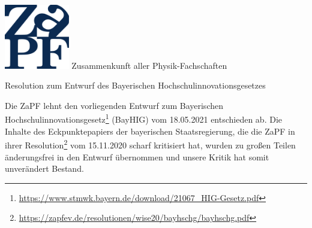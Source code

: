 \documentclass[DIV=calc]{scrartcl}
\begin{document}
\hspace{0.87\textwidth}
\begin{minipage}{120pt}
	\vspace{-1.8cm}
	\includegraphics[width=80pt]{../logo.pdf}
	\centering
	\small Zusammenkunft aller Physik-Fachschaften
\end{minipage}

\begin{center}
  \huge{Resolution zum Entwurf des Bayerischen Hochschulinnovationsgesetzes}\vspace{.25\baselineskip}\\
  \normalsize
\end{center}
\vspace{1cm}





Die ZaPF lehnt den vorliegenden Entwurf zum Bayerischen Hochschulinnovationsgesetz\footnote{\url{https://www.stmwk.bayern.de/download/21067_HIG-Gesetz.pdf}} (BayHIG) vom 18.05.2021 entschieden ab. Die Inhalte des Eckpunktepapiers der bayerischen Staatsregierung, die die ZaPF in ihrer Resolution\footnote{\url{https://zapfev.de/resolutionen/wise20/bayhschg/bayhschg.pdf}} vom 15.11.2020 scharf kritisiert hat, wurden zu großen Teilen änderungsfrei in den Entwurf übernommen und unsere Kritik hat somit unverändert Bestand.
\end{document}
